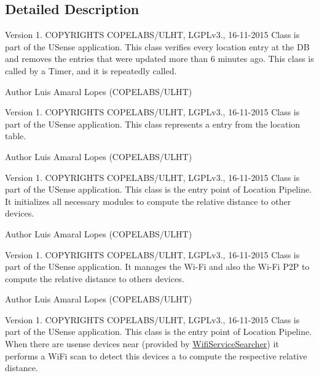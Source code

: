 \subsection{Detailed Description}
\begin{DoxyVersion}{Version}
1. C\+O\+P\+Y\+R\+I\+G\+H\+T\+S C\+O\+P\+E\+L\+A\+B\+S/\+U\+L\+H\+T, L\+G\+P\+Lv3., 16-\/11-\/2015 Class is part of the U\+Sense application. This class verifies every location entry at the D\+B and removes the entries that were updated more than 6 minutes ago. This class is called by a Timer, and it is repeatedly called. 
\end{DoxyVersion}
\begin{DoxyAuthor}{Author}
Luis Amaral Lopes (C\+O\+P\+E\+L\+A\+B\+S/\+U\+L\+H\+T)
\end{DoxyAuthor}
\begin{DoxyVersion}{Version}
1. C\+O\+P\+Y\+R\+I\+G\+H\+T\+S C\+O\+P\+E\+L\+A\+B\+S/\+U\+L\+H\+T, L\+G\+P\+Lv3., 16-\/11-\/2015 Class is part of the U\+Sense application. This class represents a entry from the location table. 
\end{DoxyVersion}
\begin{DoxyAuthor}{Author}
Luis Amaral Lopes (C\+O\+P\+E\+L\+A\+B\+S/\+U\+L\+H\+T)
\end{DoxyAuthor}
\begin{DoxyVersion}{Version}
1. C\+O\+P\+Y\+R\+I\+G\+H\+T\+S C\+O\+P\+E\+L\+A\+B\+S/\+U\+L\+H\+T, L\+G\+P\+Lv3., 16-\/11-\/2015 Class is part of the U\+Sense application. This class is the entry point of Location Pipeline. It initializes all necessary modules to compute the relative distance to other devices. 
\end{DoxyVersion}
\begin{DoxyAuthor}{Author}
Luis Amaral Lopes (C\+O\+P\+E\+L\+A\+B\+S/\+U\+L\+H\+T)
\end{DoxyAuthor}
\begin{DoxyVersion}{Version}
1. C\+O\+P\+Y\+R\+I\+G\+H\+T\+S C\+O\+P\+E\+L\+A\+B\+S/\+U\+L\+H\+T, L\+G\+P\+Lv3., 16-\/11-\/2015 Class is part of the U\+Sense application. It manages the Wi-\/\+Fi and also the Wi-\/\+Fi P2\+P to compute the relative distance to others devices. 
\end{DoxyVersion}
\begin{DoxyAuthor}{Author}
Luis Amaral Lopes (C\+O\+P\+E\+L\+A\+B\+S/\+U\+L\+H\+T)
\end{DoxyAuthor}
\begin{DoxyVersion}{Version}
1. C\+O\+P\+Y\+R\+I\+G\+H\+T\+S C\+O\+P\+E\+L\+A\+B\+S/\+U\+L\+H\+T, L\+G\+P\+Lv3., 16-\/11-\/2015 Class is part of the U\+Sense application. This class is the entry point of Location Pipeline. When there are usense devices near (provided by \hyperlink{classcs_1_1usense_1_1location_1_1_wifi_service_searcher}{Wifi\+Service\+Searcher}) it performs a Wi\+Fi scan to detect this devices a to compute the respective relative distance. 
\end{DoxyVersion}
